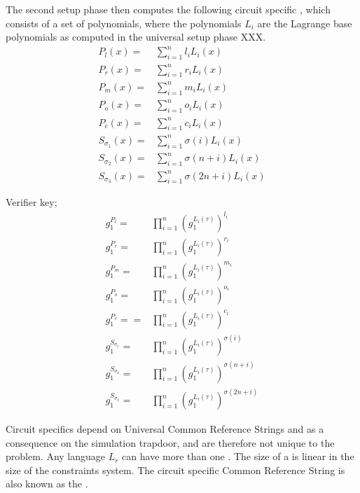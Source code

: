 The second setup phase then computes the following circuit specific , which consists of a set of polynomials, where the polynomials $L_i$ are the Lagrange base polynomials as computed in the universal setup phase XXX.
\begin{equation}
\label{def:plonk-circuit-crs}
\begin{array}{rl}
P_{l}(x) = &\sum_{i=1}^{n} {l_i}L_i(x)\\
P_{r}(x) = &\sum_{i=1}^{n} {r_i}L_i(x)\\
P_{m}(x) = &\sum_{i=1}^{n} {m_i}L_i(x)\\
P_{o}(x) = &\sum_{i=1}^{n} {o_i}L_i(x)\\
P_{c}(x) = &\sum_{i=1}^{n} {c_i}L_i(x)\\
S_{\sigma_1}(x) =& \sum_{i=1}^{n} \sigma(i)L_i(x)\\
S_{\sigma_2}(x) =& \sum_{i=1}^{n} \sigma(n+i)L_i(x)\\
S_{\sigma_3}(x) =& \sum_{i=1}^{n} \sigma(2n+i)L_i(x)
\end{array}
\end{equation}

Verifier key;
\begin{equation}
\label{def:plonk-circuit-crs}
\begin{array}{rl}
g_1^{P_l} = &\prod_{i=1}^{n} \left(g_1^{L_i(\tau)}\right)^{l_i}\\
g_1^{P_r} = &\prod_{i=1}^{n} \left(g_1^{L_i(\tau)}\right)^{r_i}\\
g_1^{P_m} = &\prod_{i=1}^{n} \left(g_1^{L_i(\tau)}\right)^{m_i}\\
g_1^{P_o} = &\prod_{i=1}^{n} \left(g_1^{L_i(\tau)}\right)^{o_i}\\
g_1^{P_c} = = &\prod_{i=1}^{n} \left(g_1^{L_i(\tau)}\right)^{c_i}\\
g_1^{S_{\sigma_1}} = &\prod_{i=1}^{n} \left(g_1^{L_i(\tau)}\right)^{\sigma(i)}\\
g_1^{S_{\sigma_2}} = &\prod_{i=1}^{n} \left(g_1^{L_i(\tau)}\right)^{\sigma(n+i)}\\
g_1^{S_{\sigma_3}} = &\prod_{i=1}^{n} \left(g_1^{L_i(\tau)}\right)^{\sigma(2n+i)}
\end{array}
\end{equation}

Circuit specifics depend on Universal Common Reference Strings and as a consequence on the simulation trapdoor, and are therefore not unique to the problem. Any language $L_r$ can have more than one . The  size of a  is linear in the size of the constraints system. The circuit specific Common Reference String is also known as the .

